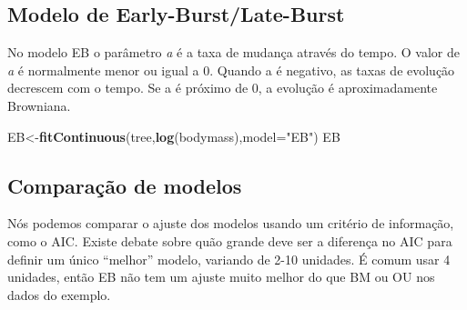 \documentclass[
]{book}
\newenvironment{Shaded}{\begin{snugshade}}{\end{snugshade}}
\newcommand{\AttributeTok}[1]{\textcolor[rgb]{0.13,0.29,0.53}{#1}}
\newcommand{\CommentTok}[1]{\textcolor[rgb]{0.56,0.35,0.01}{\textit{#1}}}
\newcommand{\FunctionTok}[1]{\textcolor[rgb]{0.13,0.29,0.53}{\textbf{#1}}}
\newcommand{\NormalTok}[1]{#1}
\newcommand{\OtherTok}[1]{\textcolor[rgb]{0.56,0.35,0.01}{#1}}
\newcommand{\SpecialCharTok}[1]{\textcolor[rgb]{0.81,0.36,0.00}{\textbf{#1}}}
\newcommand{\StringTok}[1]{\textcolor[rgb]{0.31,0.60,0.02}{#1}}
\begin{document}
\subsection{Modelo de Early-Burst/Late-Burst}\label{modelo-de-early-burstlate-burst}

No modelo EB o parâmetro \emph{a} é a taxa de mudança através do tempo. O valor de \emph{a} é normalmente menor ou igual a 0. Quando a é negativo, as taxas de evolução decrescem com o tempo. Se a é próximo de 0, a evolução é aproximadamente Browniana.

\begin{Shaded}
\begin{Highlighting}[]
\NormalTok{EB}\OtherTok{\textless{}{-}}\FunctionTok{fitContinuous}\NormalTok{(tree,}\FunctionTok{log}\NormalTok{(bodymass),}\AttributeTok{model=}\StringTok{"EB"}\NormalTok{)}
\NormalTok{EB}
\end{Highlighting}
\end{Shaded}

\subsection{Comparação de modelos}\label{comparauxe7uxe3o-de-modelos}

Nós podemos comparar o ajuste dos modelos usando um critério de informação, como o AIC. Existe debate sobre quão grande deve ser a diferença no AIC para definir um único ``melhor'' modelo, variando de 2-10 unidades. É comum usar 4 unidades, então EB não tem um ajuste muito melhor do que BM ou OU nos dados do exemplo.

\begin{Shaded}
\end{Shaded}
\end{document}
